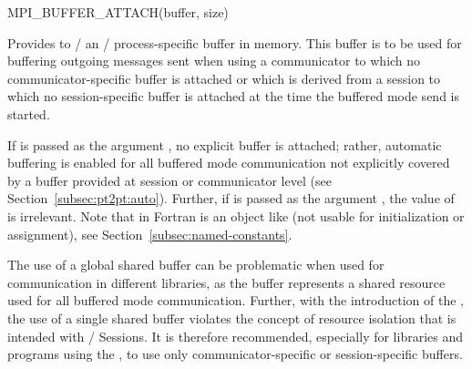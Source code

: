 \begin{funcdef}{MPI\_BUFFER\_ATTACH}{(\mbox{buffer}, \mbox{size})}
\end{funcdef}

Provides to \MPI/ an \MPI/ process-specific buffer in memory. This buffer is to be used for buffering outgoing
messages sent when using a communicator to which no communicator-specific buffer is attached or which is derived from a session to which no session-specific buffer is attached at the time the buffered mode send is started.

If  is passed as the argument , no explicit buffer is attached; rather, automatic buffering is enabled for all buffered mode communication not explicitly covered by a buffer provided at session or communicator level (see Section~\ref{subsec:pt2pt:auto}).
Further, if  is passed as the argument , the value of  is irrelevant.
Note that in Fortran  is an
object like  (not usable for initialization or
assignment), see Section~\ref{subsec:named-constants}.


\begin{users}
The use of a global shared buffer can be problematic when used for communication in different libraries, as the buffer represents a shared resource used for all buffered mode communication. Further, with the introduction of the \spm, the use of a single shared buffer violates the concept of resource isolation that is intended with \MPI/ Sessions. It is therefore recommended, especially for libraries and programs using the \spm, to use only communicator-specific or session-specific buffers.
\end{users}


